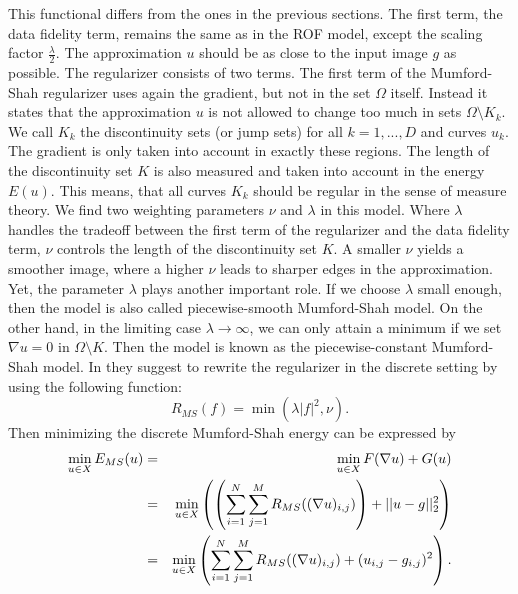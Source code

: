 \documentclass{scrreprt}
\begin{document}
        This functional differs from the ones in the previous sections. The first term, the data fidelity term, remains the same as in the ROF model, except the scaling factor $\frac{\lambda}{2}$. The approximation $u$ should be as close to the input image $g$ as possible. The regularizer consists of two terms. The first term of the Mumford-Shah regularizer uses again the gradient, but not in the set $\Omega$ itself. Instead it states that the approximation $u$ is not allowed to change too much in sets $\Omega \setminus K_{k}$. We call $K_{k}$ the discontinuity sets (or jump sets) for all $k = 1, ..., D$ and curves $u_{k}$. The gradient is only taken into account in exactly these regions. The length of the discontinuity set $K$ is also measured and taken into account in the energy $E(u)$. This means, that all curves $K_{k}$ should be regular in the sense of measure theory. We find two weighting parameters $\nu$ and $\lambda$ in this model. Where $\lambda$ handles the tradeoff between the first term of the regularizer and the data fidelity term, $\nu$ controls the length of the discontinuity set $K$. A smaller $\nu$ yields a smoother image, where a higher $\nu$ leads to sharper edges in the approximation. Yet, the parameter $\lambda$ plays another important role. If we choose $\lambda$ small enough, then the model is also called piecewise-smooth Mumford-Shah model. On the other hand, in the limiting case $\lambda \to \infty$, we can only attain a minimum if we set $\nabla u = 0$ in $\Omega \setminus K$. Then the model is known as the piecewise-constant Mumford-Shah model.
        In \cite{Strekalovskiy-Cremers-eccv14} they suggest to rewrite the regularizer in the discrete setting by using the following function:
            \begin{equation}
                R_{MS}(f) = \min(\lambda |f|^{2},\nu).
            \label{eq:ms_regularizer}
            \end{equation}
        Then minimizing the discrete Mumford-Shah energy can be expressed by
            \begin{eqnarray}
                \min_{u \in X} E_{MS}(u) &=& \min_{u \in X} F(\nabla u) + G(u) \notag \\
                &=& \min_{u \in X} \left( \left(\sum_{i = 1}^{N} \sum_{j = 1}^{M} R_{MS}((\nabla u)_{i,j}) \right) + ||u - g||_{2}^{2} \right) \notag \\
                &=& \min_{u \in X} \left(\sum_{i = 1}^{N} \sum_{j = 1}^{M} R_{MS}((\nabla u)_{i,j}) + (u_{i,j} - g_{i,j})^{2} \right).
            \end{eqnarray}
\end{document}

